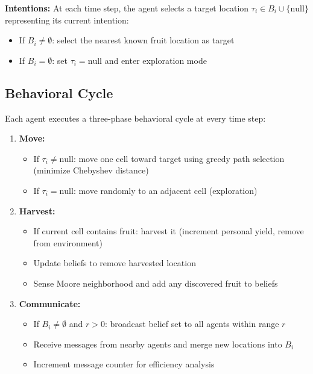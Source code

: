 \textbf{Intentions:} At each time step, the agent selects a target location $\tau_i \in B_i \cup \{\text{null}\}$ representing its current intention:
\begin{itemize}
    \item If $B_i \neq \emptyset$: select the nearest known fruit location as target
    \item If $B_i = \emptyset$: set $\tau_i = \text{null}$ and enter exploration mode
\end{itemize}

\subsection{Behavioral Cycle}

Each agent executes a three-phase behavioral cycle at every time step:

\begin{enumerate}
    \item \textbf{Move:}
    \begin{itemize}
        \item If $\tau_i \neq \text{null}$: move one cell toward target using greedy path selection (minimize Chebyshev distance)
        \item If $\tau_i = \text{null}$: move randomly to an adjacent cell (exploration)
    \end{itemize}

    \item \textbf{Harvest:}
    \begin{itemize}
        \item If current cell contains fruit: harvest it (increment personal yield, remove from environment)
        \item Update beliefs to remove harvested location
        \item Sense Moore neighborhood and add any discovered fruit to beliefs
    \end{itemize}

    \item \textbf{Communicate:}
    \begin{itemize}
        \item If $B_i \neq \emptyset$ and $r > 0$: broadcast belief set to all agents within range $r$
        \item Receive messages from nearby agents and merge new locations into $B_i$
        \item Increment message counter for efficiency analysis
    \end{itemize}
\end{enumerate}


